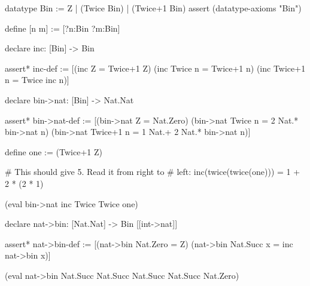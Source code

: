 %
%
\begin{tcAthena}
datatype Bin := Z | (Twice Bin) | (Twice+1 Bin)
assert (datatype-axioms "Bin")

define [n m] := [?n:Bin ?m:Bin]

declare inc: [Bin] -> Bin

assert* inc-def := [(inc Z = Twice+1 Z)
                    (inc Twice n = Twice+1 n)
                    (inc Twice+1 n = Twice inc n)]

declare bin->nat: [Bin] -> Nat.Nat

assert* bin->nat-def := [(bin->nat Z = Nat.Zero)
                         (bin->nat Twice n = 2 Nat.* bin->nat n)
                         (bin->nat Twice+1 n = 1 Nat.+ 2 Nat.* bin->nat n)]

define one := (Twice+1 Z)

# This should give 5. Read it from right to
# left: inc(twice(twice(one))) = 1 + 2 * (2 * 1)

(eval bin->nat inc Twice Twice one)

declare nat->bin: [Nat.Nat] -> Bin [[int->nat]]

assert* nat->bin-def := [(nat->bin Nat.Zero = Z)
                         (nat->bin Nat.Succ x = inc nat->bin x)]

(eval nat->bin Nat.Succ Nat.Succ Nat.Succ Nat.Succ Nat.Zero)
\end{tcAthena}
